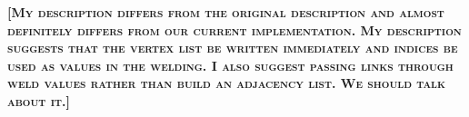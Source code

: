 \documentclass[10pt,journal,cspaper,compsoc]{IEEEtran}
\newcommand{\fix}[1]{{\color{red}\textbf{\textsc{[#1]}}}}
\begin{document}
\fix{My description differs from the original description and almost
  definitely differs from our current implementation.  My description
  suggests that the vertex list be written immediately and indices be used
  as values in the welding.  I also suggest passing links through weld
  values rather than build an adjacency list.  We should talk about it.}





\end{document}
